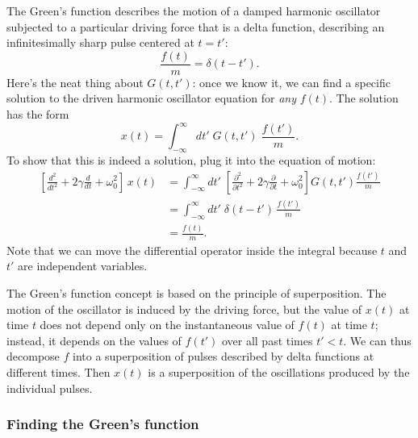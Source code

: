 \documentclass[10pt,a4paper]{article}
\begin{document}
The Green's function describes the motion of a damped harmonic
oscillator subjected to a particular driving force that is a delta
function, describing an infinitesimally sharp pulse centered at $t =
t'$:
\begin{equation}
\frac{f(t)}{m} = \delta(t-t').
\end{equation}
Here's the neat thing about $G(t,t')$: once we know it, we can find a
specific solution to the driven harmonic oscillator equation for
\emph{any} $f(t)$.  The solution has the form
\begin{equation}
x(t) = \int^\infty_{-\infty} dt' \; G(t,t') \; \frac{f(t')}{m}.
\end{equation}
To show that this is indeed a solution, plug it into the equation of
motion:
\begin{align}
  \left[\frac{d^2}{dt^2} + 2 \gamma \frac{d}{dt} + \omega_0^2\right]\, x(t)
  &= \int^\infty_{-\infty} dt' \; \left[\frac{\partial^2}{\partial t^2} + 2 \gamma \frac{\partial}{\partial t} + \omega_0^2\right] G(t,t') \frac{f(t')}{m} \\
  &= \int^\infty_{-\infty} dt' \; \delta(t-t')\, \frac{f(t')}{m} \\
  &= \frac{f(t)}{m}.
\end{align}
Note that we can move the differential operator inside the integral
because $t$ and $t'$ are independent variables.

The Green's function concept is based on the principle of superposition.
The motion of the oscillator is induced by the driving force, but the
value of $x(t)$ at time $t$ does not depend only on the
instantaneous value of $f(t)$ at time $t$; instead, it depends on
the values of $f(t')$ over all past times $t' < t$. We can thus
decompose $f$ into a superposition of pulses described by delta
functions at different times. Then $x(t)$ is a superposition of the
oscillations produced by the individual pulses.

\subsubsection{Finding the Green's function}
\label{finding-the-greens-function}
\end{document}

